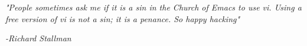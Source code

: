 \clearpage
{}

\begin{center}
\vspace*{11cm}
\textit{"People sometimes ask me if it is a sin in the Church of Emacs to use vi.
	Using a free version of vi is not a sin; it is a penance. So happy hacking"}
\end{center}
\par
\hspace*{7cm}
\textit{-Richard Stallman}

